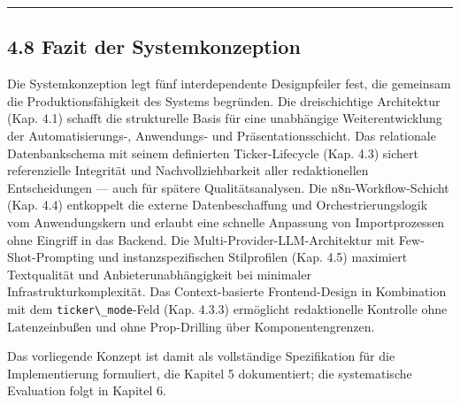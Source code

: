 \begin{center}\rule{0.5\linewidth}{0.5pt}\end{center}

\subsection{4.8 Fazit der
Systemkonzeption}\label{fazit-der-systemkonzeption}

Die Systemkonzeption legt fünf interdependente Designpfeiler fest, die
gemeinsam die Produktionsfähigkeit des Systems begründen. Die
dreischichtige Architektur (Kap. 4.1) schafft die strukturelle Basis für
eine unabhängige Weiterentwicklung der Automatisierungs-, Anwendungs-
und Präsentationsschicht. Das relationale Datenbankschema mit seinem
definierten Ticker-Lifecycle (Kap. 4.3) sichert referenzielle Integrität
und Nachvollziehbarkeit aller redaktionellen Entscheidungen --- auch für
spätere Qualitätsanalysen. Die n8n-Workflow-Schicht (Kap. 4.4)
entkoppelt die externe Datenbeschaffung und Orchestrierungslogik vom
Anwendungskern und erlaubt eine schnelle Anpassung von Importprozessen
ohne Eingriff in das Backend. Die Multi-Provider-LLM-Architektur mit
Few-Shot-Prompting und instanzspezifischen Stilprofilen (Kap. 4.5)
maximiert Textqualität und Anbieterunabhängigkeit bei minimaler
Infrastrukturkomplexität. Das Context-basierte Frontend-Design in
Kombination mit dem \passthrough{\lstinline!ticker\_mode!}-Feld (Kap.
4.3.3) ermöglicht redaktionelle Kontrolle ohne Latenzeinbußen und ohne
Prop-Drilling über Komponentengrenzen.

Das vorliegende Konzept ist damit als vollständige Spezifikation für die
Implementierung formuliert, die Kapitel 5 dokumentiert; die
systematische Evaluation folgt in Kapitel 6.
